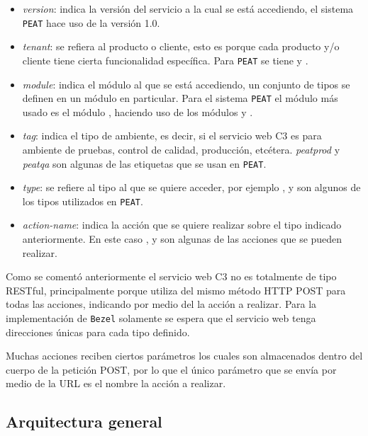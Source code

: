 \begin{itemize}
\item \textit{version}: indica la versión del servicio a la cual se está accediendo,
  el sistema \texttt{PEAT} hace uso de la versión 1.0.
\item \textit{tenant}: se refiera al producto o cliente, esto es porque cada
  producto y/o cliente tiene cierta funcionalidad específica. Para \texttt{PEAT}
  se tiene  y .
\item \textit{module}: indica el módulo al que se está accediendo, un conjunto de
  tipos se definen en un módulo en particular. Para el sistema \texttt{PEAT} el
  módulo más usado es el módulo , haciendo uso de los módulos
   y .
\item \textit{tag}: indica el tipo de ambiente, es decir, si el servicio web C3 es
  para ambiente de pruebas, control de calidad, producción, etcétera.
  \textit{peatprod} y \textit{peatqa} son algunas de las etiquetas que se usan
  en \texttt{PEAT}.
\item \textit{type}: se refiere al tipo al que se quiere acceder, por ejemplo
  ,  y
   son algunos de los tipos utilizados
  en \texttt{PEAT}.
\item \textit{action-name}: indica la acción que se quiere realizar sobre
  el tipo indicado anteriormente. En este caso , 
  y  son algunas de las acciones que se pueden realizar.
\end{itemize}

Como se comentó anteriormente el servicio web C3 no es totalmente de tipo RESTful,
principalmente porque utiliza del mismo método HTTP POST para todas las acciones,
indicando por medio del  la acción a realizar.
Para la implementación de \texttt{Bezel} solamente se espera que el servicio web
tenga direcciones únicas para cada tipo definido.

Muchas acciones reciben ciertos parámetros los cuales son almacenados dentro del
cuerpo de la petición POST, por lo que el único parámetro que se envía por medio
de la URL es el nombre la acción a realizar.

\subsection{Arquitectura general}


